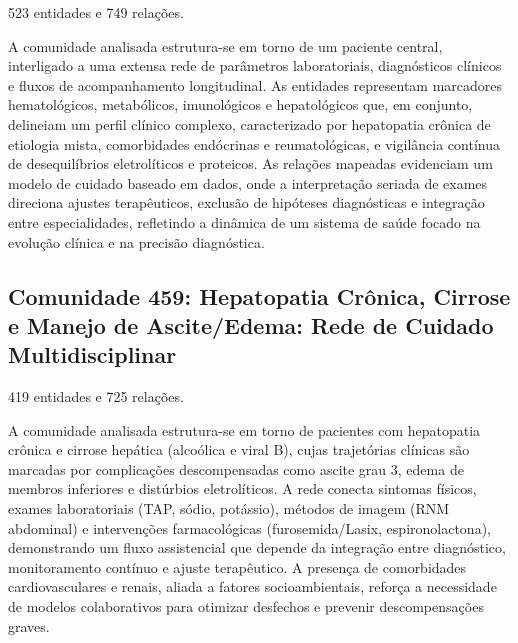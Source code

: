 {\small 523 entidades e 749 relações.}

A comunidade analisada estrutura-se em torno de um paciente central, interligado a uma extensa rede de parâmetros laboratoriais, diagnósticos clínicos e fluxos de acompanhamento longitudinal. As entidades representam marcadores hematológicos, metabólicos, imunológicos e hepatológicos que, em conjunto, delineiam um perfil clínico complexo, caracterizado por hepatopatia crônica de etiologia mista, comorbidades endócrinas e reumatológicas, e vigilância contínua de desequilíbrios eletrolíticos e proteicos. As relações mapeadas evidenciam um modelo de cuidado baseado em dados, onde a interpretação seriada de exames direciona ajustes terapêuticos, exclusão de hipóteses diagnósticas e integração entre especialidades, refletindo a dinâmica de um sistema de saúde focado na evolução clínica e na precisão diagnóstica.

\subsection*{Comunidade 459: Hepatopatia Crônica, Cirrose e Manejo de Ascite/Edema: Rede de Cuidado Multidisciplinar}

{\small 419 entidades e 725 relações.}

A comunidade analisada estrutura-se em torno de pacientes com hepatopatia crônica e cirrose hepática (alcoólica e viral B), cujas trajetórias clínicas são marcadas por complicações descompensadas como ascite grau 3, edema de membros inferiores e distúrbios eletrolíticos. A rede conecta sintomas físicos, exames laboratoriais (TAP, sódio, potássio), métodos de imagem (RNM abdominal) e intervenções farmacológicas (furosemida/Lasix, espironolactona), demonstrando um fluxo assistencial que depende da integração entre diagnóstico, monitoramento contínuo e ajuste terapêutico. A presença de comorbidades cardiovasculares e renais, aliada a fatores socioambientais, reforça a necessidade de modelos colaborativos para otimizar desfechos e prevenir descompensações graves.
